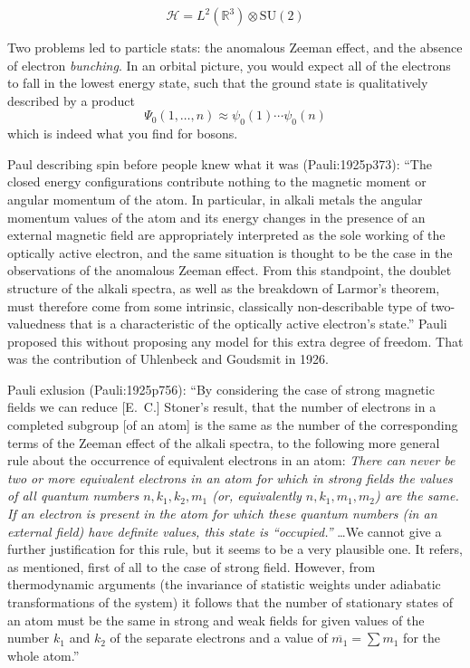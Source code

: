 \begin{equation}
    \mathcal{H}
    =
    L^2(\mathbb{R}^3)
    \otimes
    \mathrm{SU}(2)
\end{equation}


Two problems led to particle stats: the anomalous Zeeman effect, and the absence
of electron {\itshape bunching}.
In an orbital picture, you would expect all of the electrons to fall in the
lowest energy state, such that the ground state is qualitatively described by a
product
\begin{equation}
    \Psi_0(1,\ldots,n)
    \approx
    \psi_0(1)
    \cdots
    \psi_0(n)
\end{equation}
which is indeed what you find for bosons.

Paul describing spin before people knew what it was (Pauli:1925p373):
``The closed energy configurations contribute nothing to the magnetic moment or
angular momentum of the atom.
In particular, in alkali metals the angular momentum values of the atom and its
energy changes in the presence of an external magnetic field are appropriately
interpreted as the sole working of the optically active electron, and the same
situation is thought to be the case in the observations of the anomalous Zeeman
effect.
From this standpoint, the doublet structure of the alkali spectra, as well as
the breakdown of Larmor's theorem, must therefore come from some intrinsic,
classically non-describable type of two-valuedness that is a characteristic of
the optically active electron's state.''
Pauli proposed this without proposing any model for this extra degree of
freedom.
That was the contribution of Uhlenbeck and Goudsmit in 1926.


Pauli exlusion (Pauli:1925p756):
``By considering the case of strong magnetic fields we can reduce [E.~C.]
Stoner's result, that the number of electrons in a completed subgroup [of an
atom] is the same as the number of the corresponding terms of the Zeeman effect
of the alkali spectra, to the following more general rule about the occurrence
of equivalent electrons in an atom:
{\itshape
    There can never be two or more equivalent electrons in an atom for which in
    strong fields the values of all quantum numbers \(n, k_1, k_2, m_1\) (or,
    equivalently \(n, k_1, m_1, m_2\)) are  the same.
    If an electron is present in the atom for which these quantum numbers (in an
    external field) have definite values, this state is ``occupied.''%
}
\dots We cannot give a further justification for this rule, but it seems to be a
very plausible one.
It refers, as mentioned, first of all to the case of strong field.
However, from thermodynamic arguments (the invariance of statistic weights under
adiabatic transformations of the system) it follows that the number of
stationary states of an atom must be the same in strong and weak fields for
given values of the number \(k_1\) and \(k_2\) of the separate electrons and a
value of \(\overline{m_1}=\sum m_1\) for the whole atom.''

